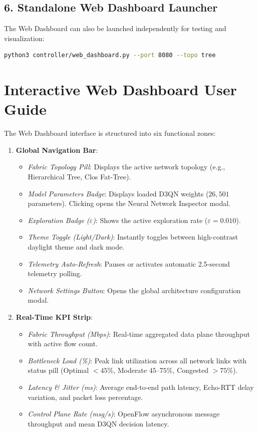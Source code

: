\documentclass[12pt,a4paper,oneside]{report}
\begin{document}
\subsection{6. Standalone Web Dashboard Launcher}
The Web Dashboard can also be launched independently for testing and visualization:
\begin{lstlisting}[language=bash]
python3 controller/web_dashboard.py --port 8080 --topo tree
\end{lstlisting}

\section{Interactive Web Dashboard User Guide}
The Web Dashboard interface is structured into six functional zones:
\begin{enumerate}
    \item \textbf{Global Navigation Bar}:
    \begin{itemize}
        \item \textit{Fabric Topology Pill}: Displays the active network topology (e.g., Hierarchical Tree, Clos Fat-Tree).
        \item \textit{Model Parameters Badge}: Displays loaded D3QN weights ($26,501$ parameters). Clicking opens the Neural Network Inspector modal.
        \item \textit{Exploration Badge ($\varepsilon$)}: Shows the active exploration rate ($\varepsilon = 0.010$).
        \item \textit{Theme Toggle (Light/Dark)}: Instantly toggles between high-contrast daylight theme and dark mode.
        \item \textit{Telemetry Auto-Refresh}: Pauses or activates automatic 2.5-second telemetry polling.
        \item \textit{Network Settings Button}: Opens the global architecture configuration modal.
    \end{itemize}
    
    \item \textbf{Real-Time KPI Strip}:
    \begin{itemize}
        \item \textit{Fabric Throughput (Mbps)}: Real-time aggregated data plane throughput with active flow count.
        \item \textit{Bottleneck Load (\%)}: Peak link utilization across all network links with status pill (Optimal $<45\%$, Moderate $45$--$75\%$, Congested $>75\%$).
        \item \textit{Latency \& Jitter (ms)}: Average end-to-end path latency, Echo-RTT delay variation, and packet loss percentage.
        \item \textit{Control Plane Rate (msg/s)}: OpenFlow asynchronous message throughput and mean D3QN decision latency.
    \end{itemize}
    

\end{enumerate}
\end{document}

